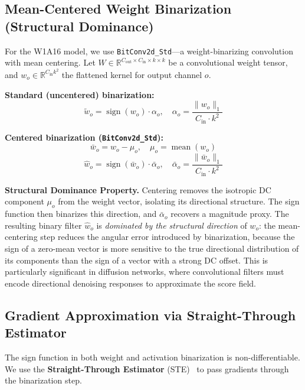 \documentclass[conference]{IEEEtran}
\begin{document}
\subsection{Mean-Centered Weight Binarization (Structural Dominance)}

For the W1A16 model, we use \texttt{BitConv2d\_Std}---a weight-binarizing convolution
with mean centering. Let $W \in \mathbb{R}^{C_\text{out} \times C_\text{in} \times k
\times k}$ be a convolutional weight tensor, and $w_o \in \mathbb{R}^{C_\text{in}k^2}$
the flattened kernel for output channel $o$.

\textbf{Standard (uncentered) binarization:}
\begin{equation}
  \tilde{w}_o = \operatorname{sign}(w_o)\cdot\alpha_o,
  \quad
  \alpha_o = \frac{\|w_o\|_1}{C_\text{in}\cdot k^2}
  \label{eq:std-bin}
\end{equation}

\textbf{Centered binarization (\texttt{BitConv2d\_Std}):}
\begin{equation}
  \bar{w}_o = w_o - \mu_o,
  \quad
  \mu_o = \operatorname{mean}(w_o)
  \label{eq:center}
\end{equation}
\begin{equation}
  \hat{w}_o = \operatorname{sign}(\bar{w}_o)\cdot\bar\alpha_o,
  \quad
  \bar\alpha_o = \frac{\|\bar{w}_o\|_1}{C_\text{in}\cdot k^2}
  \label{eq:cen-bin}
\end{equation}

\textbf{Structural Dominance Property.} Centering removes the isotropic DC component
$\mu_o$ from the weight vector, isolating its directional structure. The sign function
then binarizes this direction, and $\bar\alpha_o$ recovers a magnitude proxy. The
resulting binary filter $\hat{w}_o$ is \emph{dominated by the structural direction} of
$w_o$: the mean-centering step reduces the angular error introduced by binarization,
because the sign of a zero-mean vector is more sensitive to the true directional
distribution of its components than the sign of a vector with a strong DC offset. This
is particularly significant in diffusion networks, where convolutional filters must
encode directional denoising responses to approximate the score field.

\subsection{Gradient Approximation via Straight-Through Estimator}

The sign function in both weight and activation binarization is non-differentiable. We
use the \textbf{Straight-Through Estimator}
(STE)~\cite{bengio2013ste} to pass gradients through the binarization step.
\end{document}
